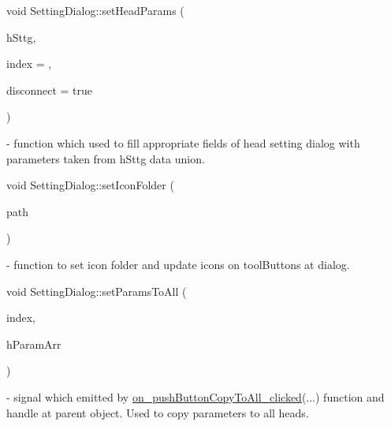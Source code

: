 \mbox{\label{classSettingDialog_a25e9a36fc58d6cc9ae3fa63ff323d139}} 
{\footnotesize\ttfamily void Setting\+Dialog\+::\texorpdfstring{set\+Head\+Params}{setHeadParams}\hspace{0.1cm}{\footnotesize\ttfamily [2/2]} (\begin{DoxyParamCaption}\item[{\mbox{\hyperlink{classHeadSetting}{Head\+Setting}}}]{h\+Sttg,  }\item[{int}]{index = {},  }\item[{bool}]{disconnect = {\ttfamily true} }\end{DoxyParamCaption})} - function which used to fill appropriate fields of head setting dialog with parameters taken from hSttg data union.  

\mbox{\label{classSettingDialog_a47c392fce9b4379ee287f94ee13add91}} 
{\footnotesize\ttfamily void Setting\+Dialog\+::\texorpdfstring{set\+Icon\+Folder}{setIconFolder} (\begin{DoxyParamCaption}\item[{Q\+String}]{path }\end{DoxyParamCaption})} - function to set icon folder and update icons on tool\+Buttons at dialog.

\mbox{\label{classSettingDialog_a3d2a5649a7c33127df571fef48c68744}} 
{\footnotesize\ttfamily void Setting\+Dialog\+::\texorpdfstring{set\+Params\+To\+All}{setParamsToAll} (\begin{DoxyParamCaption}\item[{int}]{index,  }\item[{Q\+Byte\+Array}]{h\+Param\+Arr }\end{DoxyParamCaption})\hspace{0.3cm}{\ttfamily [signal]}} - signal which emitted by \hyperlink{classSettingDialog_a991a3f7add65873f5e790dbc5b2d98f7}{on\+\_\+push\+Button\+Copy\+To\+All\+\_\+clicked}(...) function and handle at parent object. Used to copy parameters to all heads.

